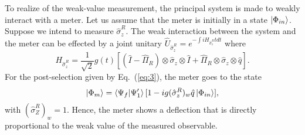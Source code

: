 \documentclass[aps,pra,showpacs,twoside,twocolumn,10pt]{revtex4-1}
\newcommand{\stkout}[1]{\ifmmode\text{\sout{\ensuremath{#1}}}\else\sout{#1}\fi}
\begin{document}
    To realize of the weak-value measurement, 
    the principal system is made to weakly interact with a meter. Let us assume that the meter is initially in a state $\ket{\Phi_{in}}$. Suppose we intend to measure $\hat{\sigma}_z^R$. The weak interaction between the system and the meter 
    can be effected by
     a joint unitary $\hat{U}_{\hat{\sigma}_z^R}=e^{-\int iH_{\hat{\sigma}_z^R}t dt}$ where
     \begin{equation}
         H_{\hat{\sigma}_z^R}=\frac{1}{\sqrt{2}}g(t)[(\hat{I}-\hat{\Pi}_R)\otimes\hat{\sigma}_z\otimes \hat{I} + \hat{\Pi}_R\otimes \hat{\sigma}_z\otimes \hat{q}].
\end{equation}
For the post-selection given by Eq.~(\ref{eq:3}), the meter goes to the state 
    \begin{equation}
    \ket{\Phi_m}=\braket{\Psi_f|\Psi_{1}^{\prime}}[1-ig(\hat{\sigma}_z^R)_w \hat{q}\ket{\Phi_{in}}],
\end{equation}
    with $(\hat{\sigma}_Z^R)_w=1$.
Hence, the meter shows a deflection that is directly proportional to the weak value of the measured observable. 
 
\end{document}
